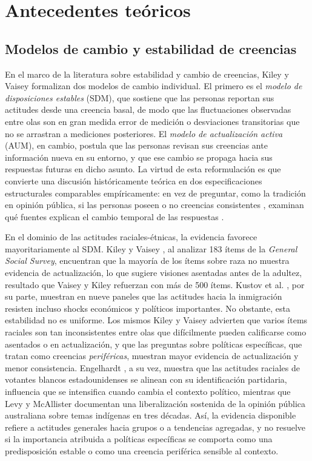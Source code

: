 \documentclass{article}
\begin{document}
\section{Antecedentes teóricos}

\subsection{Modelos de cambio y estabilidad de creencias}

En el marco de la literatura sobre estabilidad y cambio de creencias, Kiley y Vaisey \parencite*{kiley2020} formalizan dos modelos de cambio individual. El primero es el \textit{modelo de disposiciones estables} (SDM), que sostiene que las personas reportan sus actitudes desde una creencia basal, de modo que las fluctuaciones observadas entre olas son en gran medida error de medición o desviaciones transitorias que no se arrastran a mediciones posteriores. El \textit{modelo de actualización activa} (AUM), en cambio, postula que las personas revisan sus creencias ante información nueva en su entorno, y que ese cambio se propaga hacia sus respuestas futuras en dicho asunto. La virtud de esta reformulación es que convierte una discusión históricamente teórica en dos especificaciones estructurales comparables empíricamente: en vez de preguntar, como la tradición en opinión pública, si las personas poseen o no creencias consistentes \parencite{achen1975,ansolabehere2008,converse1964}, examinan qué fuentes explican el cambio temporal de las respuestas \parencite{vaisey2021}.

En el dominio de las actitudes raciales-étnicas, la evidencia favorece mayoritariamente al SDM. Kiley y Vaisey \parencite*{kiley2020}, al analizar 183 ítems de la \textit{General Social Survey}, encuentran que la mayoría de los ítems sobre raza no muestra evidencia de actualización, lo que sugiere visiones asentadas antes de la adultez, resultado que Vaisey y Kiley \parencite*{vaisey2021} refuerzan con más de 500 ítems. Kustov et al. \parencite*{kustov2021}, por su parte, muestran en nueve paneles que las actitudes hacia la inmigración resisten incluso shocks económicos y políticos importantes. No obstante, esta estabilidad no es uniforme. Los mismos Kiley y Vaisey \parencite*{kiley2020} advierten que varios ítems raciales son tan inconsistentes entre olas que difícilmente pueden calificarse como asentados o en actualización, y que las preguntas sobre políticas específicas, que tratan como creencias \textit{periféricas}, muestran mayor evidencia de actualización y menor consistencia. Engelhardt \parencite*{engelhardt2021}, a su vez, muestra que las actitudes raciales de votantes blancos estadounidenses se alinean con su identificación partidaria, influencia que se intensifica cuando cambia el contexto político, mientras que Levy y McAllister \parencite*{levy2022} documentan una liberalización sostenida de la opinión pública australiana sobre temas indígenas en tres décadas. Así, la evidencia disponible refiere a actitudes generales hacia grupos o a tendencias agregadas, y no resuelve si la importancia atribuida a políticas específicas se comporta como una predisposición estable o como una creencia periférica sensible al contexto.
\end{document}
